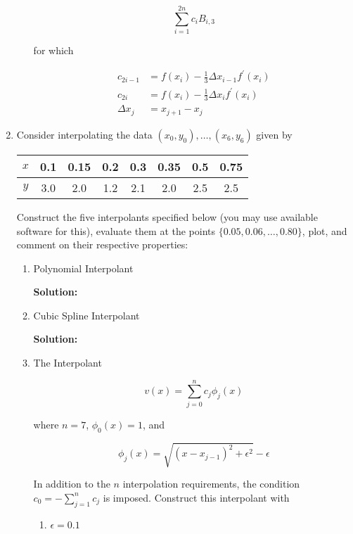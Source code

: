 \documentclass[12pt]{article}
\begin{document}
\begin{enumerate}
\begin{itemize}
  \[
      \sum_{i=1}^{2n}c_{i}B_{i,3}
  \]

  for which

  \begin{align*}
      c_{2i-1} &= f(x_{i}) - \frac{1}{3}\Delta x_{i-1}f^{\prime}(x_{i})\\
      c_{2i} &= f(x_{i}) - \frac{1}{3}\Delta x_{i}f^{\prime}(x_{i})\\
      \Delta x_{j} &= x_{j+1} - x_{j}
  \end{align*}
\end{itemize}


\item Consider interpolating the data $\left(x_{0}, y_{0}\right),\ldots,\left(x_{6}, y_{6}\right)$
given by

\begin{table}[H]
  \centering
  \begin{tabular}{| c | c | c | c | c | c | c | c |}
    $x$ & 0.1 & 0.15 & 0.2 & 0.3 & 0.35 & 0.5 & 0.75\\
    \hline
    $y$ & 3.0 & 2.0 & 1.2 & 2.1 & 2.0 & 2.5 & 2.5
  \end{tabular}
\end{table}

Construct the five interpolants specified below (you may use available software
for this), evaluate them at the points $\{ 0.05, 0.06,\ldots,0.80\}$, plot, and
comment on their respective properties:

\begin{enumerate}
  \item Polynomial Interpolant

  {\bf Solution:}

  \item Cubic Spline Interpolant

  {\bf Solution:}

  \item The Interpolant

  \[
      v(x) = \sum_{j=0}^{n}c_{j}\phi_{j}(x)
  \]

  where $n = 7$, $\phi_{0}(x) = 1$, and

  \[
      \phi_{j}(x) = \sqrt{\left( x - x_{j-1}\right)^{2} + \epsilon^{2}} - \epsilon
  \]

  In addition to the $n$ interpolation requirements, the condition $c_{0} = -\sum_{j=1}^{n}c_{j}$
  is imposed. Construct this interpolant with
    \begin{enumerate}
      \item $\epsilon = 0.1$


\end{enumerate}
\end{enumerate}
\end{enumerate}
\end{document}
